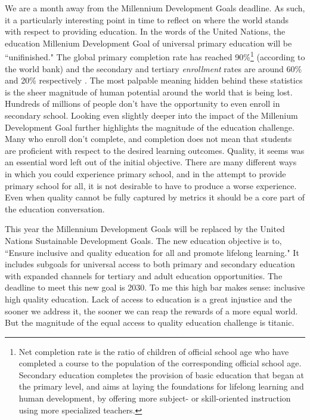 We are a month away from the Millennium Development Goals deadline. As such, it a particularly interesting point in time to reflect on where the world stands with respect to providing education. In the words of the United Nations, the education Millenium Development Goal of universal primary education will be ``unifinished." The global primary completion rate has reached 90\%\footnote{Net completion rate is the ratio of children of official school age who have completed a course to the population of the corresponding official school age. Secondary education completes the provision of basic education that began at the primary level, and aims at laying the foundations for lifelong learning and human development, by offering more subject- or skill-oriented instruction using more specialized teachers.} (according to the world bank) and the secondary and tertiary \emph{enrollment} rates are around 60\% and 20\% respectively \cite{world2015world}. The most palpable meaning hidden behind these statistics is the sheer magnitude of human potential around the world that is being lost. Hundreds of millions of people don't have the opportunity to even enroll in secondary school. Looking even slightly deeper into the impact of the Millenium Development Goal further highlights the magnitude of the education challenge. Many who enroll don't complete, and completion does not mean that students are proficient with respect to the desired learning outcomes. Quality, it seems was an essential word left out of the initial objective. There are many different ways in which you could experience primary school, and in the attempt to provide primary school for all, it is not desirable to have to produce a worse experience. Even when quality cannot be fully captured by metrics it should be a core part of the education conversation.

This year the Millennium Development Goals will be replaced by the United Nations Sustainable Development Goals. The new education objective is to, ``Ensure inclusive and quality education for all and promote lifelong learning." It includes subgoals for universal access to both primary and secondary education with expanded channels for tertiary and adult education opportunities. The deadline to meet this new goal is 2030. 
To me this high bar makes sense: inclusive high quality education. Lack of access to education is a great injustice and the sooner we address it, the sooner we can reap the rewards of a more equal world. But the magnitude of the equal access to quality education challenge is titanic. 

